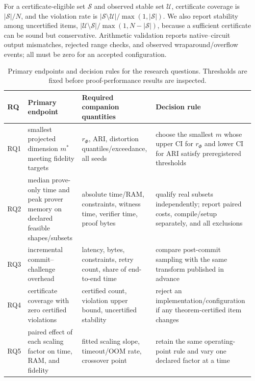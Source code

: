 \documentclass[pdflatex,sn-mathphys-num,iicol]{sn-jnl}
\theoremstyle{plain}
\theoremstyle{definition}
\theoremstyle{remark}
\begin{document}
For a certificate-eligible set $\mathcal S$ and observed stable set $\mathcal U$, certificate coverage is $|\mathcal S|/N$, and the violation rate is $|\mathcal S\setminus\mathcal U|/\max(1,|\mathcal S|)$. We also report stability among uncertified items, $|\mathcal U\setminus\mathcal S|/\max(1,N-|\mathcal S|)$, because a sufficient certificate can be sound but conservative. Arithmetic validation reports native--circuit output mismatches, rejected range checks, and observed wraparound/overflow events; all must be zero for an accepted configuration.

\begin{table}[!htbp]
\caption{Primary endpoints and decision rules for the research questions. Thresholds are fixed before proof-performance results are inspected.}\label{tab:rq-metrics-a}
\centering\scriptsize
\begin{adjustbox}{max width=\textwidth}
\begin{tabularx}{\textwidth}{@{}Y Y Y Y@{}}
\toprule
RQ & Primary endpoint & Required companion quantities & Decision rule \\
\midrule
RQ1 & smallest projected dimension $m^*$ meeting fidelity targets & $r_\Phi$, ARI, distortion quantiles/exceedance, all seeds & choose the smallest $m$ whose upper CI for $r_\Phi$ and lower CI for ARI satisfy preregistered thresholds \\
RQ2 & median prove-only time and peak prover memory on declared feasible shapes/subsets & absolute time/RAM, constraints, witness time, verifier time, proof bytes & qualify real subsets independently; report paired costs, compile/setup separately, and all exclusions \\
RQ3 & incremental commit--challenge overhead & latency, bytes, constraints, retry count, share of end-to-end time & compare post-commit sampling with the same transform published in advance \\
RQ4 & certificate coverage with zero certified violations & certified count, violation upper bound, uncertified stability & reject an implementation/configuration if any theorem-certified item changes \\
RQ5 & paired effect of each scaling factor on time, RAM, and fidelity & fitted scaling slope, timeout/OOM rate, crossover point & retain the same operating-point rule and vary one declared factor at a time \\
\bottomrule
\end{tabularx}
\end{adjustbox}
\end{table}
\end{document}
